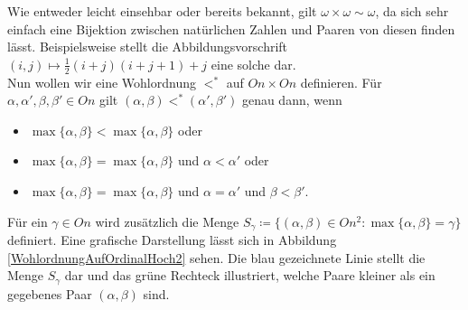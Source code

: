 Wie entweder leicht einsehbar oder bereits bekannt, gilt $\omega\times\omega\sim\omega$, da sich sehr einfach eine Bijektion zwischen natürlichen Zahlen und Paaren von diesen finden lässt. Beispielsweise stellt die Abbildungsvorschrift $(i,j)\mapsto\frac{1}{2}(i+j)(i+j+1)+j$ eine solche dar.
\\

Nun wollen wir eine Wohlordnung $<^\ast$ auf $On\times On$ definieren. Für $\alpha,\alpha',\beta,\beta'\in On$ gilt $(\alpha,\beta)<^\ast(\alpha',\beta')$ genau dann, wenn
\begin{itemize}
	\item $\max\{\alpha,\beta\}<\max\{\alpha,\beta\}$ oder
	\item $\max\{\alpha,\beta\}=\max\{\alpha,\beta\}$ und $\alpha<\alpha'$ oder
	\item $\max\{\alpha,\beta\}=\max\{\alpha,\beta\}$ und $\alpha=\alpha'$ und $\beta<\beta'$.
\end{itemize}

Für ein $\gamma\in On$ wird zusätzlich die Menge $S_\gamma\coloneqq\{(\alpha,\beta)\in On^2:\max\{\alpha,\beta\}=\gamma\}$ definiert. Eine grafische Darstellung lässt sich in Abbildung \ref{WohlordnungAufOrdinalHoch2} sehen. Die blau gezeichnete Linie stellt die Menge $S_\gamma$ dar und das grüne Rechteck illustriert, welche Paare kleiner als ein gegebenes Paar $(\alpha,\beta)$ sind.

